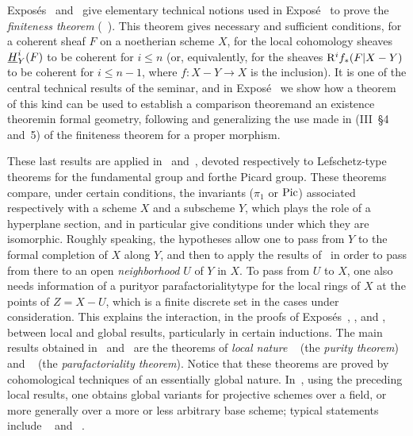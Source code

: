 Expos\'es~ and~ give elementary technical notions used in
Expos\'e~ to prove the \emph{finiteness theorem}
(~). This theorem gives necessary and sufficient
conditions, for a coherent sheaf $F$ on a noetherian scheme $X$, for the
local cohomology sheaves $\underline{H}_Y^i(F)$ to be coherent for $i\leq n$
(or, equivalently, for the sheaves $\mathrm R^if_*(F|X-Y)$ to be coherent for
$i\leq n-1$, where $f\colon X-Y\to X$ is the inclusion). It is one of the
central technical results of the seminar, and in Expos\'e~ we show
how a theorem of this kind can be used to establish a \og comparison
theorem\fg and an \og existence theorem\fg in formal geometry, following
and generalizing the use made in (\EGA III~\oldS\S 4 and~5) of the
finiteness theorem for a proper morphism.

These last results are applied in~ and~, devoted
respectively to Lefschetz-type theorems for the fundamental group and
for\pageoriginale the Picard group. These theorems compare, under certain
conditions, the invariants ($\pi_1$ or $\operatorname{Pic}$) associated respectively
with a scheme $X$ and a subscheme $Y$, which plays the role of a
hyperplane section, and in particular give conditions under which they
are isomorphic. Roughly speaking, the hypotheses allow one to pass from
$Y$ to the formal completion of $X$ along $Y$, and then to apply the
results of~ in order to pass from there to an open
\emph{neighborhood} $U$ of $Y$ in $X$. To pass from $U$ to $X$, one also
needs information of a \og purity\fg or \og parafactoriality\fg type for
the local rings of $X$ at the points of $Z=X-U$, which is a finite
discrete set in the cases under consideration. This explains the
interaction, in the proofs of Expos\'es~, , and ,
between local and global results, particularly in certain inductions. The
main results obtained in~ and~ are the theorems of
\emph{local nature} ~ (the \emph{purity theorem}) and
~ (the \emph{parafactoriality theorem}). Notice that
these theorems are proved by cohomological techniques of an essentially
global nature. In~, using the preceding local results, one
obtains global variants for projective schemes over a field, or more
generally over a more or less arbitrary base scheme; typical statements
include ~ and ~.

